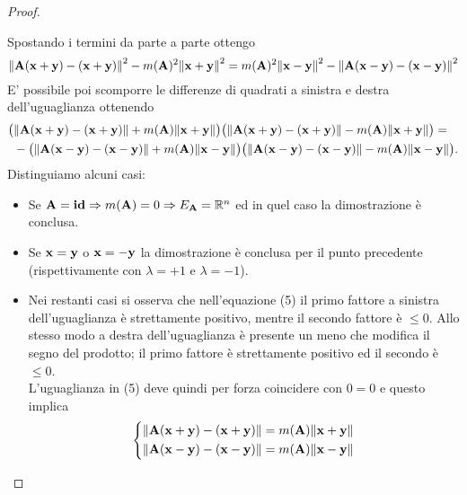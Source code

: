 \documentclass[12pt,a4paper]{book}
\begin{document}
\begin{proof}
\begin{itemize}
Spostando i termini da parte a parte ottengo
\[ \norm{\vb{A(x+y) - (x+y)}}^2 - m(\vb{A})^2 \norm{\vb{x+y}}^2=  m(\vb{A})^2 \norm{\vb{x-y}}^2 - \norm{\vb{A(x-y) - (x-y)}}^2 \]
E' possibile poi scomporre le differenze di quadrati a sinistra e destra dell'uguaglianza ottenendo
\begin{equation} 
\begin{split}
\big( & \norm{\vb{A(x+y) - (x+y)}}  + m(\vb{A})\norm{\vb{x+y}} \big) \big( \norm{\vb{A(x+y) - (x+y)}} - m(\vb{A}) \norm{\vb{x+y}} \big) = \\
& -\big( \norm{\vb{A(x-y) - (x-y)}} + m(\vb{A})\norm{\vb{x-y}} \big) \big( \norm{\vb{A(x-y) - (x-y)}} - m(\vb{A}) \norm{\vb{x-y}} \big).
\end{split}
\end{equation}
Distinguiamo alcuni casi: 
\begin{itemize}
\item Se $\vb{A} = \vb{id} \Rightarrow m(\vb{A}) = 0 \Rightarrow E_{\vb{A}} = \mathbb{R}^{n}$  ed in quel caso la dimostrazione è conclusa.
\item Se $\vb{x} = \vb{y}$ o $\vb{x} = \vb{-y}$  la dimostrazione è conclusa per il punto precedente (rispettivamente con $\lambda = +1$ e $\lambda = -1$). 
\item Nei restanti casi si osserva che nell'equazione (5) il primo fattore a sinistra dell'uguaglianza è strettamente positivo, mentre il secondo fattore è $\leq 0 $. Allo stesso modo a destra dell'uguaglianza è presente un meno che modifica il segno del prodotto; il primo fattore è strettamente positivo ed il secondo è $\leq 0 $. \\ L'uguaglianza in (5) deve quindi per forza coincidere con $0=0$ e questo implica 
\begin{equation*}
  \left\{
    \begin{aligned}
      & \norm{\vb{A(x+y) - (x+y)}} = m(\vb{A})\norm{\vb{x+y}} \\
      & \norm{\vb{A(x-y) - (x-y)}} = m(\vb{A})\norm{\vb{x-y}} 
    \end{aligned}
  \right.
\end{equation*}


\end{itemize}
\end{itemize}
\end{proof}
\end{document}
